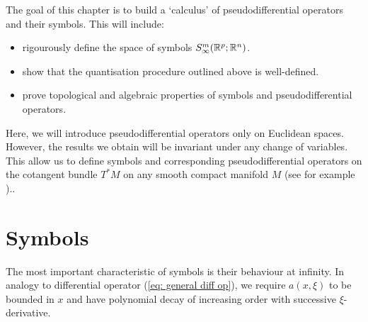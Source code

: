 \documentclass[12pt]{article}
\begin{document}
The goal of this chapter is to build a `calculus' of pseudodifferential operators and their symbols. This will include: 
\begin{itemize}
    \item rigourously define the space of symbols $S^{m}_{\infty}({\mathbb R}^{p}; {\mathbb R}^{n})$. 
    \item show that the quantisation procedure outlined above is well-defined. 
    \item prove topological and algebraic properties of symbols and pseudodifferential operators. 
\end{itemize} 

Here, we will introduce pseudodifferential operators only on Euclidean spaces. However, the results we obtain will be invariant under any change of variables.  This allow us to define symbols and corresponding pseudodifferential operators on the cotangent bundle $T^*M$ on any smooth compact manifold $M$ (see for example \cite[Chapter 2]{rbm_intro_microlocal}).. 


\section{Symbols}
The most important characteristic of symbols is their behaviour at infinity. In analogy to differential operator (\ref{eq: general diff op}), we require $a(x, \xi)$ to be bounded in $x$ and have polynomial decay of increasing order with successive $\xi$-derivative.  

\end{document}
